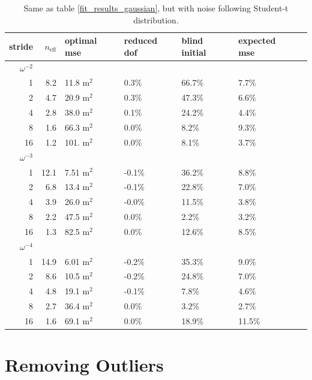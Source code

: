 \documentclass[10pt,journal]{IEEEtran}
\begin{document}
\begin{table}[ht]
\caption{Same as table \ref{fit_results_gaussian}, but with noise following Student-t distribution.}
\label{fit_results_tdistribution}
\centering
\begin{tabular}{r r p{1cm} | p{1cm}p{1cm}p{1cm}p{1cm}} stride & $n_\textrm{eff}$ & optimal mse & reduced dof & blind initial & expected mse \\ \hline \hline 
$\omega^{-2}$ &&&&&  \\ \hline 
1 & 8.2 & 11.8 m$^2$ &  0.3\%  &  66.7\%  &  7.7\%  \\ 
2 & 4.7 & 20.9 m$^2$ &  0.3\%  &  47.3\%  &  6.6\%  \\ 
4 & 2.8 & 38.0 m$^2$ &  0.1\%  &  24.2\%  &  4.4\%  \\ 
8 & 1.6 & 66.3 m$^2$ &  0.0\%  &  8.2\%  &  9.3\%  \\ 
16 & 1.2 & 101. m$^2$ &  0.0\%  &  8.1\%  &  3.7\%  \\ 
$\omega^{-3}$ &&&&&  \\ \hline 
1 & 12.1 & 7.51 m$^2$ &  -0.1\%  &  36.2\%  &  8.8\%  \\ 
2 & 6.8 & 13.4 m$^2$ &  -0.1\%  &  22.8\%  &  7.0\%  \\ 
4 & 3.9 & 26.0 m$^2$ &  -0.0\%  &  11.5\%  &  3.8\%  \\ 
8 & 2.2 & 47.5 m$^2$ &  0.0\%  &  2.2\%  &  3.2\%  \\ 
16 & 1.3 & 82.5 m$^2$ &  0.0\%  &  12.6\%  &  8.5\%  \\ 
$\omega^{-4}$ &&&&&  \\ \hline 
1 & 14.9 & 6.01 m$^2$ &  -0.2\%  &  35.3\%  &  9.0\%  \\ 
2 & 8.6 & 10.5 m$^2$ &  -0.2\%  &  24.8\%  &  7.0\%  \\ 
4 & 4.8 & 19.1 m$^2$ &  -0.1\%  &  7.8\%  &  4.6\%  \\ 
8 & 2.7 & 36.4 m$^2$ &  0.0\%  &  3.2\%  &  2.7\%  \\ 
16 & 1.6 & 69.1 m$^2$ &  0.0\%  &  18.9\%  &  11.5\%  \\ 
\end{tabular} 

\end{table}



\section{Removing Outliers}
\label{sec:outliers}
\end{document}
